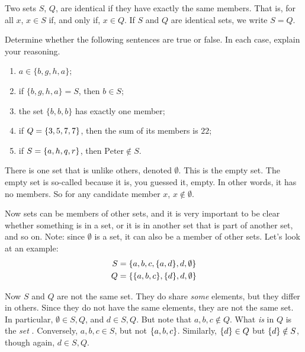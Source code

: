 \begin{defn} Two sets $S$, $Q$, are identical if they have exactly the same members. That is, for all $x$, $x \in S$ if, and only if, $x \in Q$. If $S$ and $Q$ are identical sets, we write $S=Q$.
\end{defn}

\begin{exc}
Determine whether the following sentences are true or false. In each case, explain your reasoning. 

\begin{enumerate}
	\item $a \in \{b, g, h, a\}$;
	\item if $\{b, g, h, a\}=S$, then $b \in S$;
	\item the set $\{b, b, b\}$ has exactly one member;
	\item if $Q=\{3, 5, 7, 7\}$, then the sum of its members is $22$;
	\item if $S=\{a, h, q, r\}$, then $\text{Peter} \notin S$.
\end{enumerate}
\end{exc}

There is one set that is unlike others, denoted $\emptyset$. This is the empty set. The empty set is so-called because it is, you guessed it, empty. In other words, it has no members. So for any candidate member $x$, $x \notin \emptyset$. 

Now sets can be members of other sets, and it is very important to be clear whether something is in a set, or it is in another set that is part of another set, and so on. Note: since $\emptyset$ is a set, it can also be a member of other sets. Let's look at an example: 
\begin{align*}
	S&=\{a, b, c, \{a, d\}, d, \emptyset\}\\
	Q&=\{\{a, b, c\}, \{d\}, d, \emptyset\}
\end{align*}

Now $S$ and $Q$ are not the same set. They do share \textit{some} elements, but they differ in others. Since they do not have the same elements, they are not the same set. In particular, $\emptyset \in S, Q$, and $d \in S, Q$. But note that $a, b, c \notin Q$. What \textit{is} in $Q$ is the \textit{set} . Conversely, $a, b, c \in S$, but not $\{a, b, c\}$. Similarly, $\{d\} \in Q$ but $\{d\} \notin S$, though again, $d \in S, Q$. 

